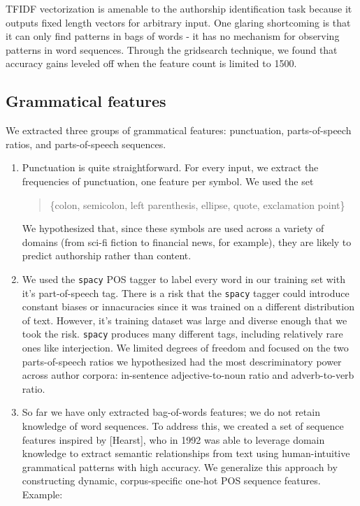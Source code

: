 \documentclass[8pt]{article}
\begin{document}
TFIDF vectorization is amenable to the authorship identification task because it outputs fixed length vectors for arbitrary input. One glaring shortcoming is that it can only find patterns in bags of words - it has no mechanism for observing patterns in word sequences. Through the gridsearch technique, we found that accuracy gains leveled off when the feature count is limited to 1500.

\subsection{Grammatical features}
We extracted three groups of grammatical features: punctuation, parts-of-speech ratios, and parts-of-speech sequences.

\begin{enumerate}
  \item Punctuation is quite straightforward. For every input, we extract the frequencies of punctuation, one feature per symbol. We used the set 
  \begin{quote} \{colon, semicolon, left parenthesis, ellipse, quote, exclamation point\}
  \end{quote} 
  We hypothesized that, since these symbols are used across a variety of domains (from sci-fi fiction to financial news, for example), they are likely to predict authorship rather than content.
  \item We used the \texttt{spacy} POS tagger to label every word in our training set with it's part-of-speech tag. There is a risk that the \texttt{spacy} tagger could introduce constant biases or innacuracies since it was trained on a different distribution of text. However, it's training dataset was large and diverse enough that we took the risk. \texttt{spacy} produces many different tags, including relatively rare ones like interjection. We limited degrees of freedom and focused on the two parts-of-speech ratios we hypothesized had the most descriminatory power across author corpora: in-sentence adjective-to-noun ratio and adverb-to-verb ratio.
  \item So far we have only extracted bag-of-words features; we do not retain knowledge of word sequences. To address this, we created a set of sequence features inspired by [Hearst], who in 1992 was able to leverage domain knowledge to extract semantic relationships from text using human-intuitive grammatical patterns with high accuracy. We generalize this approach by constructing dynamic, corpus-specific one-hot POS sequence features. Example:


\end{enumerate}
\end{document}
